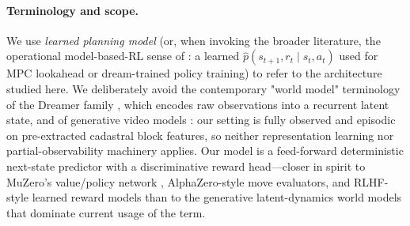 \documentclass[11pt]{article}
\begin{document}
\paragraph{Terminology and scope.} We use \emph{learned planning model} (or, when invoking the broader literature, the operational model-based-RL sense of \citealp{chua2018deep,janner2019trust}: a learned $\hat{p}(s_{t+1}, r_t \mid s_t, a_t)$ used for MPC lookahead or dream-trained policy training) to refer to the architecture studied here. We deliberately avoid the contemporary "world model" terminology of the Dreamer family \citep{hafner2025dreamerv3,hansen2024tdmpc2}, which encodes raw observations into a recurrent latent state, and of generative video models \citep[e.g.][]{ha2018world}: our setting is fully observed and episodic on pre-extracted cadastral block features, so neither representation learning nor partial-observability machinery applies. Our model is a feed-forward deterministic next-state predictor with a discriminative reward head---closer in spirit to MuZero's value/policy network \citep{schrittwieser2020muzero}, AlphaZero-style move evaluators, and RLHF-style learned reward models \citep{christiano2017deep,ouyang2022training} than to the generative latent-dynamics world models that dominate current usage of the term.
\end{document}
